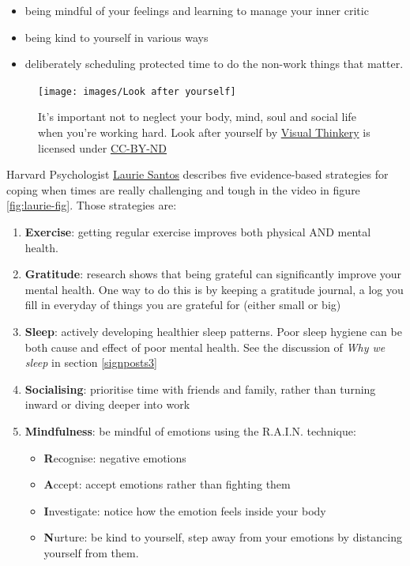 \documentclass[
]{book}
\providecommand{\tightlist}{%
  \setlength{\itemsep}{0pt}\setlength{\parskip}{0pt}}
\begin{document}
\begin{itemize}
\tightlist
\item
  being mindful of your feelings and learning to manage your inner critic
\item
  being kind to yourself in various ways
\item
  deliberately scheduling protected time to do the non-work things that matter.
\end{itemize}

\begin{figure}

{\centering \texttt{[image: images/Look after yourself]} 

}

\caption{It's important not to neglect your body, mind, soul and social life when you're working hard. Look after yourself by \href{https://visualthinkery.com}{Visual Thinkery} is licensed under \href{https://creativecommons.org/licenses/by-nd/4.0/}{CC-BY-ND}}\label{fig:lookafter-fig}
\end{figure}



Harvard Psychologist \href{https://en.wikipedia.org/wiki/Laurie_R._Santos}{Laurie Santos} describes five evidence-based strategies for coping when times are really challenging and tough in the video in figure \ref{fig:laurie-fig}. Those strategies are:

\begin{enumerate}
\def\labelenumi{\arabic{enumi}.}
\tightlist
\item
  \textbf{Exercise}: getting regular exercise improves both physical AND mental health.
\item
  \textbf{Gratitude}: research shows that being grateful can significantly improve your mental health. One way to do this is by keeping a gratitude journal, a log you fill in everyday of things you are grateful for (either small or big)
\item
  \textbf{Sleep}: actively developing healthier sleep patterns. Poor sleep hygiene can be both cause and effect of poor mental health. See the discussion of \emph{Why we sleep} \citep{whywesleep} in section \ref{signposts3}
\item
  \textbf{Socialising}: prioritise time with friends and family, rather than turning inward or diving deeper into work
\item
  \textbf{Mindfulness}: be mindful of emotions using the R.A.I.N. technique:

  \begin{itemize}
  \tightlist
  \item
    \textbf{R}ecognise: negative emotions
  \item
    \textbf{A}ccept: accept emotions rather than fighting them
  \item
    \textbf{I}nvestigate: notice how the emotion feels inside your body
  \item
    \textbf{N}urture: be kind to yourself, step away from your emotions by distancing yourself from them.
  \end{itemize}
\end{enumerate}
\end{document}
